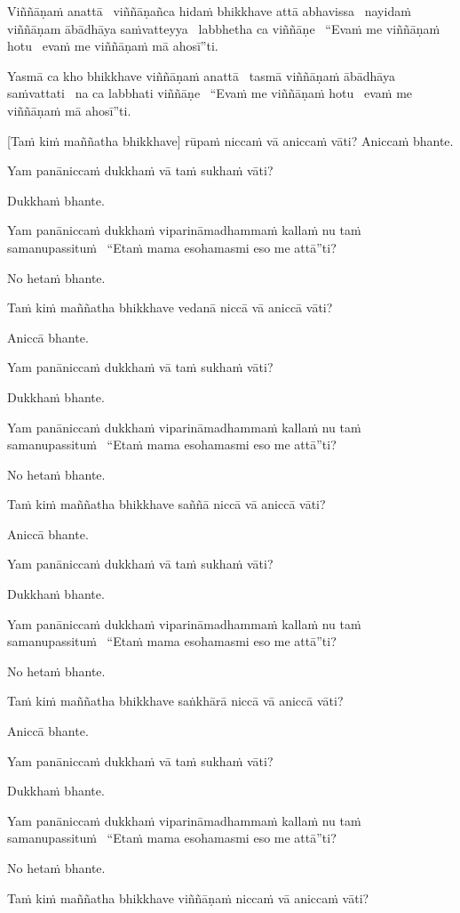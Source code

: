 Viññāṇaṁ anattā \breathmark\ viññāṇañca hidaṁ bhikkhave attā abhavissa \breathmark\ nayidaṁ viññāṇam ābādhāya saṁvatteyya \breathmark\ labbhetha ca viññāṇe \breathmark\ “Evaṁ me viññāṇaṁ hotu \breathmark\ evaṁ me viññāṇaṁ mā ahosī”ti.

Yasmā ca kho bhikkhave viññāṇaṁ anattā \breathmark\ tasmā viññāṇaṁ ābādhāya saṁvattati \breathmark\ na ca labbhati viññāṇe \breathmark\ “Evaṁ me viññāṇaṁ hotu \breathmark\ evaṁ me viññāṇaṁ mā ahosī”ti.

[Taṁ kiṁ maññatha bhikkhave] rūpaṁ niccaṁ vā aniccaṁ vāti? Aniccaṁ bhante.

Yam panāniccaṁ dukkhaṁ vā taṁ sukhaṁ vāti?

Dukkhaṁ bhante.

Yam panāniccaṁ dukkhaṁ viparināmadhammaṁ kallaṁ nu taṁ samanupassituṁ \breathmark\ “Etaṁ mama esohamasmi eso me attā”ti?

No hetaṁ bhante.

Taṁ kiṁ maññatha bhikkhave vedanā niccā vā aniccā vāti?

Aniccā bhante.

Yam panāniccaṁ dukkhaṁ vā taṁ sukhaṁ vāti?

Dukkhaṁ bhante.

Yam panāniccaṁ dukkhaṁ viparināmadhammaṁ kallaṁ nu taṁ samanupassituṁ \breathmark\ “Etaṁ mama esohamasmi eso me attā”ti?

No hetaṁ bhante.

Taṁ kiṁ maññatha bhikkhave saññā niccā vā aniccā vāti?

Aniccā bhante.

Yam panāniccaṁ dukkhaṁ vā taṁ sukhaṁ vāti?

Dukkhaṁ bhante.

Yam panāniccaṁ dukkhaṁ viparināmadhammaṁ kallaṁ nu taṁ samanupassituṁ \breathmark\ “Etaṁ mama esohamasmi eso me attā”ti?

No hetaṁ bhante.

Taṁ kiṁ maññatha bhikkhave saṅkhārā niccā vā aniccā vāti?

Aniccā bhante.

Yam panāniccaṁ dukkhaṁ vā taṁ sukhaṁ vāti?

Dukkhaṁ bhante.

Yam panāniccaṁ dukkhaṁ viparināmadhammaṁ kallaṁ nu taṁ samanupassituṁ \breathmark\ “Etaṁ mama esohamasmi eso me attā”ti?

No hetaṁ bhante.

Taṁ kiṁ maññatha bhikkhave viññāṇaṁ niccaṁ vā aniccaṁ vāti?

